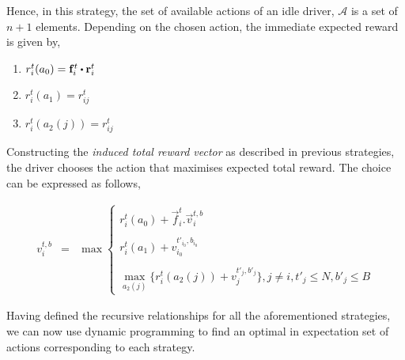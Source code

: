Hence, in this strategy, the set of available actions of an idle driver, $\mathcal{A}$ is a set of $n+1$ elements. Depending on the chosen action, the immediate expected reward is given by,

\begin{enumerate}
    \item $r_{i}^{t}(a_0) = \vec{f}_{i}^{t} \bigcdot \vec{r}_{i}^{t}$ \\
    \item $r_{i}^{t}(a_1) = r_{ij}^{t}$ \\
    \item $r_{i}^{t}(a_2(j)) = r_{ij}^{t}$
\end{enumerate}

Constructing the \textit{induced total reward vector} as described in previous strategies, the driver chooses the action that maximises expected total reward. The choice can be expressed as follows,

\begin{eqnarray}
v_{i}^{t,b} &=& \max
    \begin{cases}
    r_{i}^{t}(a_0) + \vec{f}_{i}^{t}.\vec{v}_{i}^{t,b} \\ \\
    r_{i}^{t}(a_1) + v_{i_0}^{t'_{i_0},b_{i_0}} \\ \\
    \max_{a_2(j)} \bigg\{r_{i}^{t}(a_2(j)) + v_{j}^{t'_{j},b'_{j}}\bigg\}, j \neq i, t'_{j} \leq N, b'_{j} \leq B
    \end{cases}
\end{eqnarray}

Having defined the recursive relationships for all the aforementioned strategies, we can now use dynamic programming to find an optimal in expectation set of actions corresponding to each strategy.

